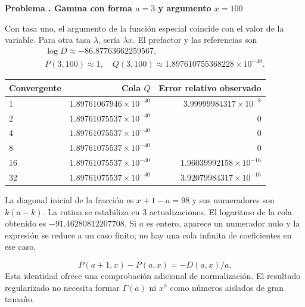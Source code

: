 \documentclass[11pt,a4paper]{article}
\theoremstyle{definition}
\newcounter{problema}
\newenvironment{resuelto}[1]{\refstepcounter{problema}\par\medskip\Needspace{6\baselineskip}\textbf{Problema \theproblema. #1}\par}{\par\medskip}
\begin{document}
\begin{resuelto}{Gamma con forma $a=3$ y argumento $x=100$}
Con tasa uno, el argumento de la función especial coincide con el valor de la variable. Para otra tasa $\lambda$, sería $\lambda x$. El prefactor y las referencias son
\[
\begin{gathered}
\log D\approx-86.87763662259567,\\
P(3,100)\approx1,\quad Q(3,100)\approx1.897610755368228\times10^{-40}.
\end{gathered}
\]

\begin{center}\small\begin{tabular}{lrr}
\toprule
Convergente & Cola $Q$ & Error relativo observado\\\midrule
1 & $1.89761067946\times10^{-40}$ & $3.99999984317\times10^{-8}$\\
2 & $1.89761075537\times10^{-40}$ & $0$\\
4 & $1.89761075537\times10^{-40}$ & $0$\\
8 & $1.89761075537\times10^{-40}$ & $0$\\
16 & $1.89761075537\times10^{-40}$ & $1.96039992158\times10^{-16}$\\
32 & $1.89761075537\times10^{-40}$ & $3.92079984317\times10^{-16}$\\
\bottomrule\end{tabular}\end{center}

La diagonal inicial de la fracción es $x+1-a=98$ y sus numeradores son $k(a-k)$. La rutina se estabiliza en 3 actualizaciones. El logaritmo de la cola obtenido es $-91.46280812207708$.
Si $a$ es entero, aparece un numerador nulo y la expresión se reduce a un caso finito; no hay una cola infinita de coeficientes en ese caso.

\[
P(a+1,x)-P(a,x)=-D(a,x)/a.
\]
Esta identidad ofrece una comprobación adicional de normalización. El resultado regularizado no necesita formar $\Gamma(a)$ ni $x^a$ como números aislados de gran tamaño.
\end{resuelto}
\end{document}
